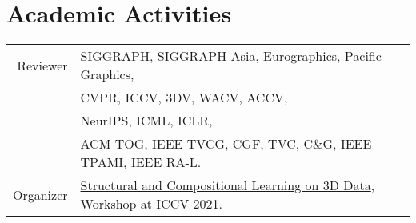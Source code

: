 \documentclass[letterpaper,10pt]{article} %
\begin{document}
{%

\section{Academic Activities}


\begin{tabular}{rl}
Reviewer & SIGGRAPH, SIGGRAPH Asia, Eurographics, Pacific Graphics, \\
  & CVPR, ICCV, 3DV, WACV, ACCV, \\
  & NeurIPS, ICML, ICLR, \\
  & ACM TOG, IEEE TVCG, CGF, TVC, C\&G, IEEE TPAMI, IEEE RA-L. \\
Organizer & \href{https://geometry.stanford.edu/struco3d/}{Structural and Compositional Learning on 3D Data}, Workshop at ICCV 2021. \\
\end{tabular}\\

}
\end{document}
